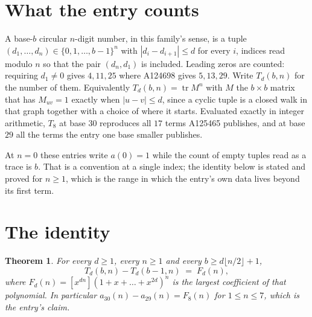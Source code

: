 \documentclass[11pt,a4paper]{article}
\theoremstyle{plain}
\newtheorem{theorem}{Theorem}
\theoremstyle{definition}
\begin{document}
\section{What the entry counts}

A base-$b$ circular $n$-digit number, in this family's sense, is a tuple
$(d_1,\dots,d_n)\in\{0,1,\dots,b-1\}^{n}$ with $|d_i-d_{i+1}|\le d$ for every $i$, indices
read modulo $n$ so that the pair $(d_n,d_1)$ is included. Leading zeros are counted: requiring
$d_1\ne0$ gives $4,11,25$ where A124698 gives $5,13,29$. Write $T_d(b,n)$ for the number of
them. Equivalently $T_d(b,n)=\operatorname{tr}M^{n}$ with $M$ the $b\times b$ matrix that has
$M_{uv}=1$ exactly when $|u-v|\le d$, since a cyclic tuple is a closed walk in that graph
together with a choice of where it starts. Evaluated exactly in integer arithmetic, $T_{8}$
at base $30$ reproduces all $17$ terms A125465 publishes, and at base $29$ all the
terms the entry one base smaller publishes.

At $n=0$ these entries write $a(0)=1$ while the count of empty tuples read as a trace is $b$.
That is a convention at a single index; the identity below is stated and proved for $n\ge1$,
which is the range in which the entry's own data lives beyond its first term.

\section{The identity}

\begin{theorem}
For every $d\ge1$, every $n\ge1$ and every $b\ge d\lfloor n/2\rfloor+1$,
\[
T_d(b,n)-T_d(b-1,n)\;=\;F_d(n),
\]
where $F_d(n)=[x^{dn}](1+x+\dots+x^{2d})^{n}$ is the largest coefficient of that
polynomial. In particular $a_{30}(n)-a_{29}(n)=F_{8}(n)$ for $1\le n\le7$, which
is the entry's claim.
\end{theorem}
\end{document}
